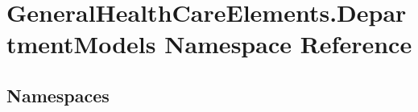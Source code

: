\hypertarget{namespace_general_health_care_elements_1_1_department_models}{}\section{General\+Health\+Care\+Elements.\+Department\+Models Namespace Reference}
\label{namespace_general_health_care_elements_1_1_department_models}
\subsection*{Namespaces}
\begin{DoxyCompactItemize}
\end{DoxyCompactItemize}
